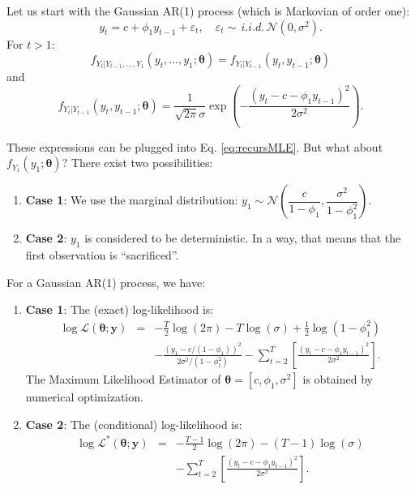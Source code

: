 \documentclass[
  12pt,
]{book}
\providecommand{\tightlist}{%
  \setlength{\itemsep}{0pt}\setlength{\parskip}{0pt}}
\theoremstyle{definition}
\theoremstyle{definition}
\theoremstyle{definition}
\theoremstyle{definition}
\theoremstyle{remark}
\begin{document}
Let us start with the Gaussian AR(1) process (which is Markovian of order one):
\[
y_t = c + \phi_1 y_{t-1} + \varepsilon_t, \quad \varepsilon_t \sim\,i.i.d.\, \mathcal{N}(0,\sigma^2).
\]
For \(t>1\):
\[
f_{Y_t|Y_{t-1},\dots,Y_1}(y_t,\dots,y_1;\boldsymbol\theta) = f_{Y_t|Y_{t-1}}(y_t,y_{t-1};\boldsymbol\theta)
\]
and
\[
f_{Y_t|Y_{t-1}}(y_t,y_{t-1};\boldsymbol\theta) = \frac{1}{\sqrt{2\pi}\sigma}\exp\left(-\frac{(y_t - c - \phi_1 y_{t-1})^2}{2\sigma^2}\right).
\]

These expressions can be plugged into Eq. \eqref{eq:recursMLE}. But what about \(f_{Y_1}(y_1;\boldsymbol\theta)\)? There exist two possibilities:

\begin{enumerate}
\def\labelenumi{\arabic{enumi}.}
\tightlist
\item
  \textbf{Case 1}: We use the marginal distribution: \(y_1 \sim \mathcal{N}\left(\dfrac{c}{1-\phi_1},\dfrac{\sigma^2}{1-\phi_1^2}\right)\).
\item
  \textbf{Case 2}: \(y_1\) is considered to be deterministic. In a way, that means that the first observation is ``sacrificed''.
\end{enumerate}

For a Gaussian AR(1) process, we have:

\begin{enumerate}
\def\labelenumi{\arabic{enumi}.}
\item
  \textbf{Case 1}: The (exact) log-likelihood is:
  \begin{eqnarray}
  \log \mathcal{L}(\boldsymbol\theta;\mathbf{y})  &=& - \frac{T}{2} \log(2\pi) - T\log(\sigma) + \frac{1}{2}\log(1-\phi_1^2)\nonumber \\
  && - \frac{(y_1 - c/(1-\phi_1))^2}{2\sigma^2/(1-\phi_1^2)} - \sum_{t=2}^T \left[\frac{(y_t - c - \phi_1 y_{t-1})^2}{2\sigma^2} \right].
  \end{eqnarray}
  The Maximum Likelihood Estimator of \(\boldsymbol\theta= [c,\phi_1,\sigma^2]\) is obtained by numerical optimization.
\item
  \textbf{Case 2}: The (conditional) log-likelihood is:
  \begin{eqnarray}
  \log \mathcal{L}^*(\boldsymbol\theta;\mathbf{y})  &=& - \frac{T-1}{2} \log(2\pi) - (T-1)\log(\sigma)\nonumber\\
  && - \sum_{t=2}^T \left[\frac{(y_t - c - \phi_1 y_{t-1})^2}{2\sigma^2} \right].\label{eq:Lstar}
  \end{eqnarray}
\end{enumerate}
\end{document}
